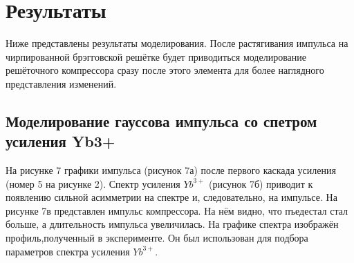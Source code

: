 \documentclass[12pt]{article}
\begin{document}
\clearpage
\section{Результаты}

Ниже представлены результаты моделирования. После растягивания импульса на чирпированной брэгговской решётке
будет приводиться моделирование решёточного компрессора сразу после этого элемента для более наглядного
представления изменений.

\subsection{Моделирование гауссова импульса со спетром усиления Yb3+}

На рисунке 7 графики импульса (рисунок 7а) после первого каскада усиления (номер 5 на рисунке 2). Спектр усиления
$Yb^{3+}$ (рисунок 7б) приводит к появлению сильной асимметрии на спектре и, следовательно, на импульсе. На рисунке 7в
представлен импульс компрессора. На нём видно, что пъедестал стал больше, а длительность импульса увеличилась.
На графике спектра изображён профиль,полученный в эксперименте. Он был использован для подбора параметров спектра
усиления $Yb^{3+}$.
\end{document}
